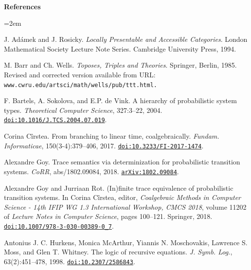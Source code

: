 %
\hypertarget{html:bib}{} \par\noindent\textbf{References}\quad  
\begin{list}{}{\leftmargin=2em}
\hypertarget{html:bib.bib1}{}
\item[]  [1]  J. Adámek and J. Rosicky.  \emph{Locally Presentable and Accessible Categories}.  London Mathematical Society Lecture Note Series. Cambridge University Press, 1994.  
\hypertarget{html:bib.bib2}{}
\item[]  [2]  M. Barr and Ch. Wells.  \emph{Toposes, Triples and Theories}.  Springer, Berlin, 1985.  Revised and corrected version available from URL: \nolinkurl{www.cwru.edu/artsci/math/wells/pub/ttt.html.}  
\hypertarget{html:bib.bib3}{}
\item[]  [3]  F. Bartels, A. Sokolova, and E.P. de Vink.  A hierarchy of probabilistic system types.  \emph{Theoretical Computer Science}, 327:3–22, 2004.  \href{https://doi.org/10.1016/J.TCS.2004.07.019}{\nolinkurl{doi:10.1016/J.TCS.2004.07.019}}.  
\hypertarget{html:bib.bib4}{}
\item[]  [4]  Corina Cîrstea.  From branching to linear time, coalgebraically.  \emph{Fundam. Informaticae}, 150(3-4):379–406, 2017.  \href{https://doi.org/10.3233/FI-2017-1474}{\nolinkurl{doi:10.3233/FI-2017-1474}}.  
\hypertarget{html:bib.bib5}{}
\item[]  [5]  Alexandre Goy.  Trace semantics via determinization for probabilistic transition systems.  \emph{CoRR}, abs/1802.09084, 2018.  \href{https://arxiv.org/abs/1802.09084}{\texttt{arXiv:1802.09084}}.  
\hypertarget{html:bib.bib6}{}
\item[]  [6]  Alexandre Goy and Jurriaan Rot.  (In)finite trace equivalence of probabilistic transition systems.  In Corina Cîrstea, editor, \emph{Coalgebraic Methods in Computer Science - 14th IFIP WG 1.3 International Workshop, CMCS 2018}, volume 11202 of \emph{Lecture Notes in Computer Science}, pages 100–121. Springer, 2018.  \href{https://doi.org/10.1007/978-3-030-00389-0_7}{\nolinkurl{doi:10.1007/978-3-030-00389-0_7}}.  
\hypertarget{html:bib.bib7}{}
\item[]  [7]  Antonius J. C. Hurkens, Monica McArthur, Yiannis N. Moschovakis, Lawrence S. Moss, and Glen T. Whitney.  The logic of recursive equations.  \emph{J. Symb. Log.}, 63(2):451–478, 1998.  \href{https://doi.org/10.2307/2586843}{\nolinkurl{doi:10.2307/2586843}}.  

\end{list}
